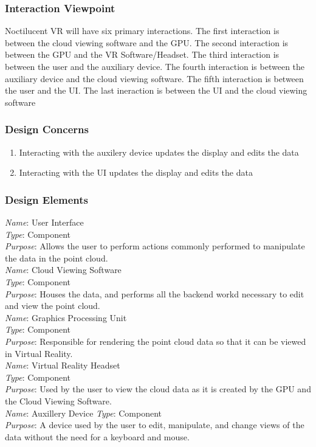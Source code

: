 \subsubsection{Interaction Viewpoint}

Noctilucent VR will have six primary interactions.
The first interaction is between the cloud viewing software and the GPU.
The second interaction is between the GPU and the VR Software/Headset.
The third interaction is between the user and the auxiliary device.
The fourth interaction is between the auxiliary device and the cloud viewing software.
The fifth interaction is between the user and the UI.
The last ineraction is between the UI and the cloud viewing software

\subsubsection{Design Concerns}

\begin{enumerate}
	\item Interacting with the auxilery device updates the display and edits the data
	\item Interacting with the UI updates the display and edits the data
\end{enumerate}

\subsubsection{Design Elements}

		\textit{Name}: User Interface\\
		\textit{Type}: Component\\
		\textit{Purpose}: Allows the user to perform actions commonly performed to manipulate the data in the point cloud.\\
\newline
		\textit{Name}: Cloud Viewing Software\\
		\textit{Type}: Component\\
		\textit{Purpose}: Houses the data, and performs all the backend workd necessary to edit and view the point cloud.\\
\newline
		\textit{Name}: Graphics Processing Unit\\
		\textit{Type}: Component\\
		\textit{Purpose}: Responsible for rendering the point cloud data so that it can be viewed in Virtual Reality.\\
\newline
		\textit{Name}: Virtual Reality Headset\\
		\textit{Type}: Component\\
		\textit{Purpose}: Used by the user to view the cloud data as it is created by the GPU and the Cloud Viewing Software.\\
\newline
		\textit{Name}: Auxillery Device
		\textit{Type}: Component\\
		\textit{Purpose}: A device used by the user to edit, manipulate, and change views of the data without the need for a keyboard and mouse.

